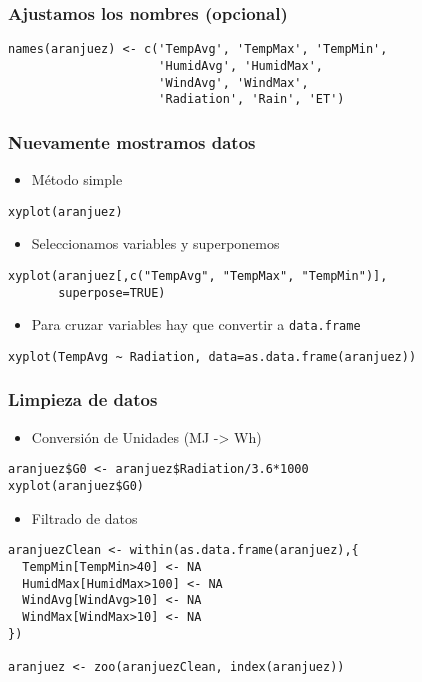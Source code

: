 \documentclass[bigger]{beamer}
\begin{document}
\begin{frame}[fragile]
\frametitle{Ajustamos los nombres (opcional)}
\label{sec-1-3-3}


\lstset{language=R}
\begin{lstlisting}
names(aranjuez) <- c('TempAvg', 'TempMax', 'TempMin',
                     'HumidAvg', 'HumidMax',
                     'WindAvg', 'WindMax',
                     'Radiation', 'Rain', 'ET')
\end{lstlisting}
\end{frame}
\begin{frame}[fragile]
\frametitle{Nuevamente mostramos datos}
\label{sec-1-3-4}

\begin{itemize}
\item Método simple
\end{itemize}

\lstset{language=R}
\begin{lstlisting}
xyplot(aranjuez)
\end{lstlisting}
\begin{itemize}
\item Seleccionamos variables y superponemos
\end{itemize}

\lstset{language=R}
\begin{lstlisting}
xyplot(aranjuez[,c("TempAvg", "TempMax", "TempMin")],
       superpose=TRUE)
\end{lstlisting}
\begin{itemize}
\item Para cruzar variables hay que convertir a \texttt{data.frame}
\end{itemize}

\lstset{language=R}
\begin{lstlisting}
xyplot(TempAvg ~ Radiation, data=as.data.frame(aranjuez))
\end{lstlisting}
\end{frame}
\begin{frame}[fragile]
\frametitle{Limpieza de datos}
\label{sec-1-3-5}

\begin{itemize}
\item Conversión de Unidades (MJ -> Wh)
\end{itemize}

\lstset{language=R}
\begin{lstlisting}
aranjuez$G0 <- aranjuez$Radiation/3.6*1000
xyplot(aranjuez$G0)
\end{lstlisting}
\begin{itemize}
\item Filtrado de datos
\end{itemize}

\lstset{language=R}
\begin{lstlisting}
aranjuezClean <- within(as.data.frame(aranjuez),{
  TempMin[TempMin>40] <- NA
  HumidMax[HumidMax>100] <- NA
  WindAvg[WindAvg>10] <- NA
  WindMax[WindMax>10] <- NA
})

aranjuez <- zoo(aranjuezClean, index(aranjuez))
\end{lstlisting}
\end{frame}
\end{document}
